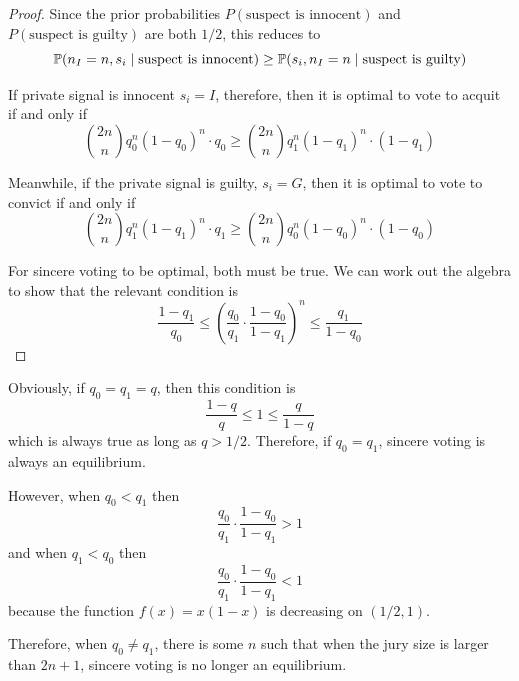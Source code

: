 \documentclass[../../../main.tex]{subfiles}
\begin{document}
\begin{theorem}
\begin{proof}
        Since the prior probabilities $P(\textrm{suspect is innocent})$ and $P(\textrm{suspect is guilty})$ are both $1/2$,
        this reduces to 
        \begin{equation*}
            \mathbb{P}(n_I=n,s_i\mid \textrm{suspect is innocent})
            \geq\mathbb{P}(s_i, n_I=n\mid\textrm{suspect is guilty})
        \end{equation*}
        
        If private signal is innocent $s_i=I$, therefore, then it is optimal to vote to acquit if and only if
        \begin{equation*}
            \binom{2n}{n}q_0^n(1-q_0)^n\cdot q_0\geq \binom{2n}{n}q_1^n(1-q_1)^n\cdot (1-q_1)
        \end{equation*}

        Meanwhile, if the private signal is guilty, $s_i=G$, then it is optimal to vote to convict if and only if
        \begin{equation*}
            \binom{2n}{n}q_1^n(1-q_1)^n\cdot q_1\geq \binom{2n}{n}q_0^n(1-q_0)^n\cdot (1-q_0)
        \end{equation*}

        For sincere voting to be optimal, both must be true. We can work out the algebra to show that the relevant condition is
        \begin{equation*}
            \frac{1-q_1}{q_0}\leq \left(\frac{q_0}{q_1}\cdot\frac{1-q_0}{1-q_1}\right)^n\leq \frac{q_1}{1-q_0}
        \end{equation*}
    \end{proof}
\end{theorem}

\begin{remark}
    Obviously, if $q_0=q_1=q$, then this condition is
        \begin{equation*}
            \frac{1-q}{q}\leq 1\leq \frac{q}{1-q}
        \end{equation*}
        which is always true as long as $q>1/2$. 
        Therefore, if $q_0=q_1$, sincere voting is always an equilibrium.

        However, when $q_0<q_1$ then
        \begin{equation*}
            \frac{q_0}{q_1}\cdot\frac{1-q_0}{1-q_1}>1 
        \end{equation*}
        and when $q_1<q_0$ then
        \begin{equation*}
            \frac{q_0}{q_1}\cdot\frac{1-q_0}{1-q_1}<1 
        \end{equation*}
        because the function $f(x)=x(1-x)$ is decreasing on $(1/2,1)$.

    Therefore, when $q_0\neq q_1$, there is some $n$ such that when the jury size is larger than $2n+1$, sincere voting is no longer an equilibrium.
\end{remark}
\end{document}
